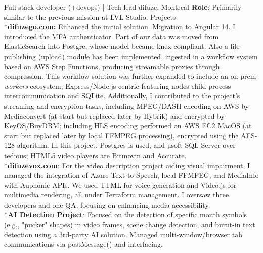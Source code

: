 \documentclass[
  a4paper,
   maincolor=cvblue,
   sectioncolor=cvblue,
]{fortysecondscv}
\begin{document}
\newpage
\restoregeometry
{}\paperwidth

\makefrontsidebar

\vspace*{-2.9em} %
\begin{cvtable}
    {Full stack developer (+devops) | Tech lead}
    {difuze, Montreal}
    {
      \textbf{Role}: Primarily similar to the previous mission at LVL Studio. Projects:\\
        \noindent\hspace*{1mm}*\textbf{difuzego.com:} Enhanced the initial solution.
        Migration to Angular 14.
        I introduced the MFA authenticator.
        Part of our data was moved from ElasticSearch into Postgre, whose model became knex-compliant.
        Also a file publishing (upload) module has been implemented,
        ingested in a workflow system based on AWS Step Functions,
        producing streamable proxies through compression.
        This workflow solution was further expanded to include an on-prem \textit{workers}
        ecosystem, Express/Node.js-centric featuring nodes child process intercommunication and SQLite.
        Additionally, I contributed to the project's streaming and encryption tasks,
        including MPEG/DASH encoding on AWS by Mediaconvert (at start but replaced later by Hybrik) and encrypted by KeyOS/BuyDRM;
        including HLS encoding performed on AWS EC2 MacOS (at start but replaced later by local FFMPEG processing), encrypted using the AES-128 algorithm.
        In this project, Postgres is used, and µsoft SQL Server over tedious; HTML5 video players are Bitmovin and Accurate. \\
        \noindent\hspace*{1mm}*\textbf{difuzevox.com}: For the video description project aiding visual impairment, I managed the integration of Azure Text-to-Speech, local FFMPEG, and MediaInfo with Auphonic APIs. We used TTML for voice generation and Video.js for multimedia rendering, all under Terraform management. I oversaw three developers and one QA, focusing on enhancing media accessibility.\\
        \noindent\hspace*{1mm}*\textbf{AI Detection Project}: Focused on the detection of specific mouth symbols (e.g., "pucker" shapes) in video frames, scene change detection, and burnt-in text detection using a 3rd-party AI solution. Managed multi-window/browser tab communications via postMessage() and interfacing.\\
}
\end{cvtable}
\end{document}
